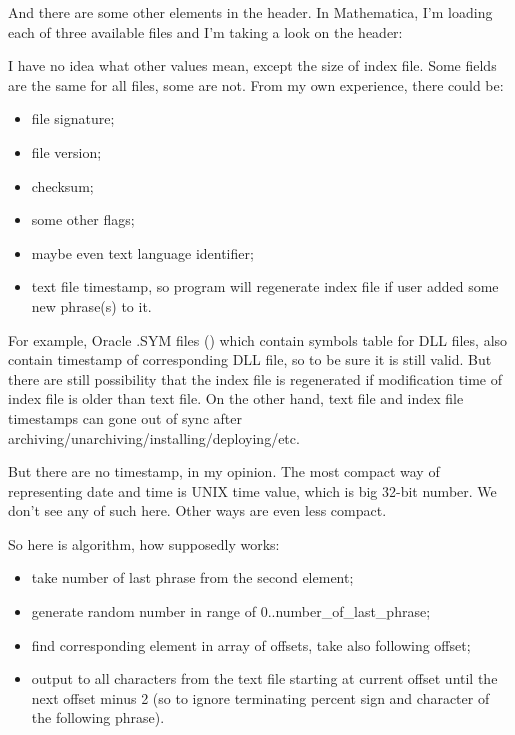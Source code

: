 And there are some other elements in the header.
In Mathematica, I'm loading each of three available files and I'm taking a look on the header:

\begin{figure}[H]
\centering
{}
\end{figure}

I have no idea what other values mean, except the size of index file.
Some fields are the same for all files, some are not.
From my own experience, there could be:

\begin{itemize}
\item file signature;
\item file version;
\item checksum;
\item some other flags;
\item maybe even text language identifier;
\item text file timestamp, so  program will regenerate index file if user added some new phrase(s) to it.
\end{itemize}

For example, Oracle .SYM files () which contain symbols table for DLL files, also contain timestamp of corresponding DLL file, so to be sure it is still valid.
But there are still possibility that the index file is regenerated if modification time of index file is older than text file.
On the other hand, text file and index file timestamps can gone out of sync after archiving/unarchiving/installing/deploying/etc.

But there are no timestamp, in my opinion. The most compact way of representing date and time is UNIX time value, which is big 32-bit number. We don't see any of such here. Other ways are even less compact.

So here is algorithm, how  supposedly works:

\begin{itemize}
\item take number of last phrase from the second element;
\item generate random number in range of 0..number\_of\_last\_phrase;
\item find corresponding element in array of offsets, take also following offset;
\item output to  all characters from the text file starting at current offset until
the next offset minus 2 (so to ignore terminating percent sign 
and character of the following phrase).
\end{itemize}

